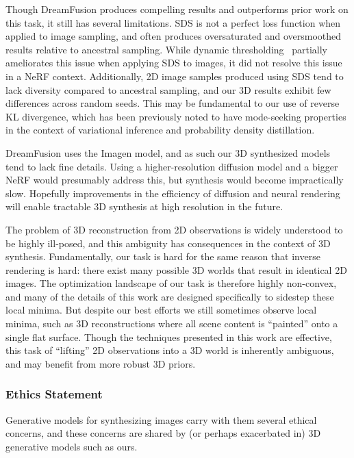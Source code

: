 \documentclass{article} \usepackage{iclr2023_conference,times}
\newcommand{\sacc}{SDS\xspace}
\newcommand{\dreamfusion}{DreamFusion\xspace}
\begin{document}
Though \dreamfusion{} produces compelling results and outperforms prior work on this task, it still has several limitations.
\sacc is not a perfect loss function when applied to image sampling, and often produces oversaturated and oversmoothed results relative to ancestral sampling.
While dynamic thresholding~\citep{imagen} partially ameliorates this issue when applying \sacc to images, it did not resolve this issue in a NeRF context.
Additionally, 2D image samples produced using \sacc tend to lack diversity compared to ancestral sampling, and our 3D results exhibit few differences across random seeds.
This may be fundamental to our use of reverse KL divergence, which has been previously noted to have mode-seeking properties in the context of variational inference and probability density distillation.

\dreamfusion uses the  Imagen model, and as such our 3D synthesized models tend to lack fine details. Using a higher-resolution diffusion model and a bigger NeRF would presumably address this, but synthesis would become impractically slow. Hopefully improvements in the efficiency of diffusion and neural rendering will enable tractable 3D synthesis at high resolution in the future.

The problem of 3D reconstruction from 2D observations is widely understood to be highly ill-posed, and this ambiguity has consequences in the context of 3D synthesis. Fundamentally, our task is hard for the same reason that inverse rendering is hard: there exist many possible 3D worlds that result in identical 2D images.
The optimization landscape of our task is therefore highly non-convex, and many of the details of this work are designed specifically to sidestep these local minima. But despite our best efforts we still sometimes observe local minima, such as 3D reconstructions where all scene content is ``painted'' onto a single flat surface. Though the techniques presented in this work are effective, this task of ``lifting'' 2D observations into a 3D world is inherently ambiguous, and may benefit from more robust 3D priors.



\clearpage
\subsubsection*{Ethics Statement}


Generative models for synthesizing images carry with them several ethical concerns, and these concerns are shared by (or perhaps exacerbated in) 3D generative models such as ours.
\end{document}
